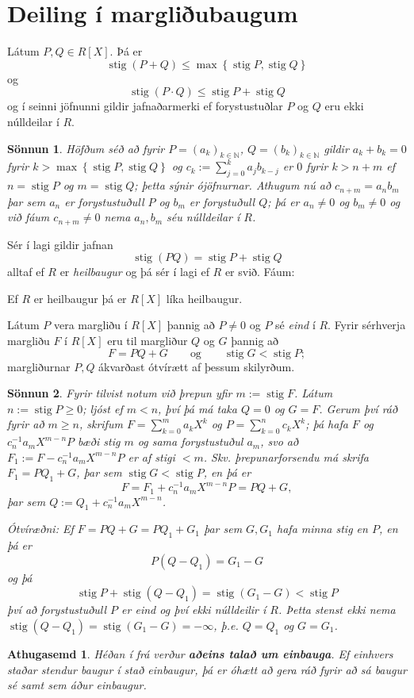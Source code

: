 \documentclass[a4paper,icelandic,11pt]{book}
\theoremstyle{plain}
\newtheorem*{ath}{Athugasemd}
\newtheorem*{sonnun}{Sönnun}
\newcommand{\N}{\mathbb{N}}
\DeclareMathOperator{\stig}{stig} %
\begin{document}
\section{Deiling í margliðubaugum}
\begin{setn}
  Látum $P,Q\in R[X]$. Þá er\[
  \stig(P+Q) \leq \max\left\{ \stig P,\stig Q \right\}
  \]
  og \[
  \stig(P\cdot Q) \leq \stig P + \stig Q
  \]
  og í seinni jöfnunni gildir jafnaðarmerki ef forystustuðlar $P$ og $Q$ eru
  ekki núlldeilar í $R$.
\end{setn}
\begin{sonnun}
  Höfðum séð að fyrir $P = (a_k)_{k\in\N}$, $Q=(b_k)_{k\in\N}$ gildir $a_k+b_k =
  0$ fyrir $k > \max\left\{ \stig P,\stig Q \right\}$ og $c_k :=
  \sum_{j=0}^{k}a_j b_{k-j}$ er $0$ fyrir $k > n+m$ ef $n = \stig P$
  og $m = \stig Q$; þetta sýnir ójöfnurnar. Athugum nú að $c_{n+m}=a_n b_m$ þar
  sem $a_n$ er forystustuðull $P$ og $b_m$ er forystuðull $Q$; þá er $a_n\neq 0$
  og $b_m\neq 0$ og við fáum $c_{n+m}\neq 0$ nema $a_n,b_m$ séu núlldeilar í
  $R$.
\end{sonnun}
Sér í lagi gildir jafnan
\[
 \stig(PQ) = \stig P + \stig Q
\]
alltaf ef $R$ er \emph{heilbaugur} og þá sér í lagi ef $R$ er svið. Fáum:
\begin{fylgisetn}
  Ef $R$ er heilbaugur þá er $R[X]$ líka heilbaugur.
\end{fylgisetn}
\begin{setn}
  Látum $P$ vera margliðu í $R[X]$ þannig að $P\neq 0$ og $P$ sé \emph{eind} í
  $R$. Fyrir sérhverja margliðu $F$ í $R[X]$ eru til margliður $Q$ og $G$
  þannig að\[
  F = PQ + G 
  \qquad\text{og}\qquad 
  \stig G < \stig P;
  \]
  margliðurnar $P,Q$ ákvarðast ótvírætt af þessum skilyrðum.
\end{setn}
\begin{sonnun}
  Fyrir tilvist notum við þrepun yfir $m:=\stig F$. Látum $n:=\stig P\geq 0$;
  ljóst ef $m < n$, því þá má taka $Q=0$ og $G=F$. Gerum því ráð fyrir að
  $m\geq n$, skrifum $F = \sum_{k=0}^{m} a_k X^k$ og $P = \sum_{k=0}^{n} c_k
  X^k$; þá hafa $F$ og $c_n^{-1} a_m X^{m-n} P$ bæði stig $m$ og sama
  forystustuðul $a_m$, svo að $F_1 := F - c_n^{-1} a_m X^{m-n} P$ er af stigi
  $< m$. Skv. þrepunarforsendu má skrifa $F_1 = PQ_1 + G$, þar sem $\stig G <
  \stig P$, en þá er\[
  F = F_1 + c_n^{-1} a_m X^{m-n} P = PQ + G,
  \]
  þar sem $Q := Q_1 + c_n^{-1}a_m X^{m-n}$.
  
  \emph{Ótvíræðni:} Ef $F = PQ + G = PQ_1 + G_1$ þar sem $G,G_1$ hafa minna stig
  en $P$, en þá er\[
  P(Q-Q_1) = G_1 - G
  \]
  og þá\[
  \stig P + \stig(Q-Q_1) = \stig(G_1-G) < \stig P
  \]
  því að forystustuðull $P$ er eind og því ekki núlldeilir í $R$. Þetta stenst
  ekki nema $\stig(Q-Q_1) = \stig (G_1-G)=-\infty$, þ.e. $Q=Q_1$ og $G = G_1$.
\end{sonnun}
\begin{ath}
  Héðan í frá verður \textbf{aðeins talað um einbauga}. Ef einhvers staðar
  stendur \emph{baugur} í stað \emph{einbaugur}, þá er óhætt að gera ráð fyrir
  að sá baugur sé samt sem áður einbaugur.
\end{ath}
\end{document}
